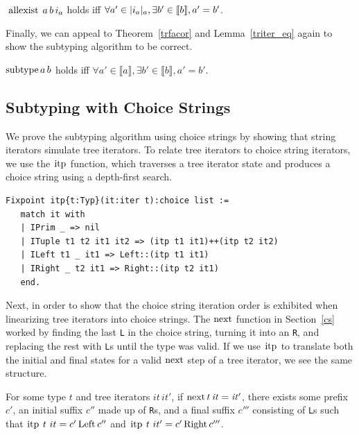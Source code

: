 \documentclass[a4paper,english]{lipics-v2019}
\newcommand{\denotes}[1]{\llbracket #1 \rrbracket}
\renewcommand{\L}{{\tt L}\xspace}
\newcommand{\Ls}{{\tt L}s\xspace}
\newcommand{\R}{{\tt R}\xspace}
\newcommand{\Rs}{{\tt R}s\xspace}
\renewcommand{\c}[1]{\ensuremath{\text{\lstinline{#1}}}\xspace}
\begin{document}
\begin{theorem}\label{trfacor}
$\c{allexist}\,a\,b\,i_a$ holds iff $\forall a'\in \irch{i_a}{a},
  \exists b'\in \denotes{b}, a'= b'$.
\end{theorem}

\noindent
Finally, we can appeal to Theorem~\ref{trfacor} and Lemma~\ref{triter_eq}
again to show the subtyping algorithm to be correct.

\begin{theorem}
$\c{subtype}\,a\,b$ holds iff $\forall a' \in \denotes{a}, \exists b' \in
  \denotes{b}, a' = b'$.
\end{theorem}

\subsection{Subtyping with Choice Strings}

We prove the subtyping algorithm using choice strings by showing that string
iterators simulate tree iterators.  To relate tree iterators to choice
string iterators, we use the \c{itp} function, which traverses a tree
iterator state and produces a choice string using a depth-first search.

\newpage
\begin{lstlisting}
Fixpoint itp{t:Typ}(it:iter t):choice list :=
   match it with
   | IPrim _ => nil
   | ITuple t1 t2 it1 it2 => (itp t1 it1)++(itp t2 it2)
   | ILeft t1 _ it1 => Left::(itp t1 it1)
   | IRight _ t2 it1 => Right::(itp t2 it1)
   end.
\end{lstlisting}

\noindent
Next, in order to show that the choice string iteration order is exhibited
when linearizing tree iterators into choice strings.  The \c{next} function
in Section~\ref{cs} worked by finding the last \L in the choice string,
turning it into an \R, and replacing the rest with \Ls until the type was
valid. If we use \c{itp} to translate both the initial and final states for a valid
\c{next} step of a tree iterator, we see the same structure.

\begin{lemma}
\label{lem:snt}
For some type $t$ and tree iterators $\mathit{it}\,\mathit{it}'$, if
$\c{next}\,t\,\mathit{it}=\mathit{it'}$, there exists some prefix  $c'$, an
initial suffix $c''$ made up of \Rs, and a final suffix  $c'''$
consisting of \Ls such that $\c{itp}~t~it=c'\,\c{Left}\,c''$ and 
$\c{itp}~t~it'=c'\,\c{Right}\,c'''$.
\end{lemma}
\end{document}
